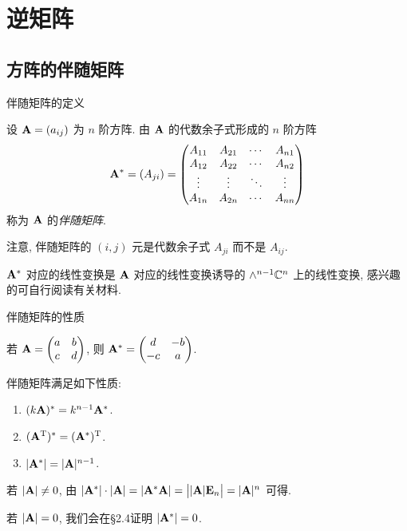 \section{逆矩阵}

\subsection{方阵的伴随矩阵}

\begin{frame}{伴随矩阵的定义}
	\onslide<+->
	\begin{definition}
		设 ${\mathbf{A}}=(a_{ij})$ 为 $n$ 阶方阵.
		由 ${\mathbf{A}}$ 的代数余子式形成的 $n$ 阶方阵
		\[{\mathbf{A}}^*=(A_{ji})=\begin{pmatrix}
			A_{11}&A_{21}&\cdots&A_{n1}\\
			A_{12}&A_{22}&\cdots&A_{n2}\\
			\vdots&\vdots&\ddots&\vdots\\
			A_{1n}&A_{2n}&\cdots&A_{nn}
		\end{pmatrix}\]
		称为 ${\mathbf{A}}$ 的\emph{伴随矩阵}.
	\end{definition}
	\onslide<+->
	注意, 伴随矩阵的 $(i,j)$ 元是代数余子式 \alert{$A_{ji}$ 而不是 $A_{ij}$}.

	\onslide<+->
	${\mathbf{A}}^*$ 对应的线性变换是 ${\mathbf{A}}$ 对应的线性变换诱导的 $\wedge^{n-1}{\mathbb{C}}^n$ 上的线性变换, 感兴趣的可自行阅读有关材料.
\end{frame}


\begin{frame}{伴随矩阵的性质}
	\onslide<+->
	\begin{example}
		若 ${\mathbf{A}}=\begin{pmatrix}
			a&b\\c&d
		\end{pmatrix}$, 则 ${\mathbf{A}}^*=\begin{pmatrix}
			d&-b\\-c&a
		\end{pmatrix}$.
	\end{example}
	\onslide<+->
	伴随矩阵满足如下性质:
	\onslide<+->
	\begin{block@}
		\begin{enumerate}
			\item $(k{\mathbf{A}})^*=k^{n-1}{\mathbf{A}}^*$.
			\item $({\mathbf{A}}^{\mathrm{T}})^*=({\mathbf{A}}^*)^{\mathrm{T}}$.
			\item \alert{$|{\mathbf{A}}^*|=|{\mathbf{A}}|^{n-1}$}.
		\end{enumerate}
	\end{block@}
	\onslide<+->
	若 $|{\mathbf{A}}|\neq0$, 由 $|{\mathbf{A}}^*|\cdot|{\mathbf{A}}|=|{\mathbf{A}}^*{\mathbf{A}}|=\bigl||{\mathbf{A}}|{\mathbf{E}}_n\bigr|=|{\mathbf{A}}|^n$ 可得.

	\onslide<+->
	若 $|{\mathbf{A}}|=0$, 我们会在\S2.4证明 $|{\mathbf{A}}^*|=0$.
\end{frame}


